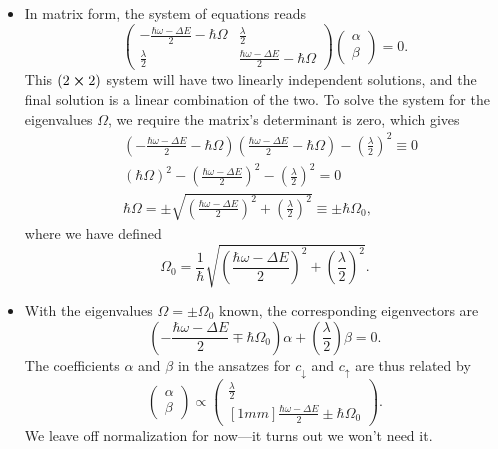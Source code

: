 \documentclass[11pt, a4paper]{article}
\newcommand{\ua}{\uparrow}  %
\newcommand{\da}{\downarrow}  %
\begin{document}
\begin{itemize}
	\item In matrix form, the system of equations reads
	\begin{equation*}
		\begin{pmatrix}
            -\frac{\hbar \omega - \Delta E}{2} - \hbar \Omega & \frac{\lambda}{2}\\[1mm]
			\frac{\lambda}{2} & \frac{\hbar \omega - \Delta E}{2} - \hbar \Omega
		\end{pmatrix}
		\begin{pmatrix}
		\alpha\\
		\beta
		\end{pmatrix}
		= 0.
	\end{equation*}
    This $ (2 \cross 2) $ system will have two linearly independent solutions, and the final solution is a linear combination of the two. To solve the system for the eigenvalues $ \Omega $, we require the matrix's determinant is zero, which gives
	\begin{align*}
		&\left(-\frac{\hbar \omega - \Delta E}{2} - \hbar \Omega\right)\left(\frac{\hbar \omega - \Delta E}{2} - \hbar \Omega\right) - \left(\frac{\lambda}{2}\right)^{2} \equiv 0\\
		&(\hbar \Omega)^{2} - \left(\frac{\hbar \omega - \Delta E}{2}\right)^{2} - \left(\frac{\lambda}{2}\right)^{2} = 0\\
		& \hbar \Omega = \pm \sqrt{\left(\frac{\hbar \omega - \Delta E}{2}\right)^{2} + \left(\frac{\lambda}{2}\right)^{2}} \equiv \pm \hbar \Omega_{0},
	\end{align*}
    where we have defined
    \begin{equation*}
        \Omega_{0} = \frac{1}{\hbar} \sqrt{\left(\frac{\hbar \omega - \Delta E}{2}\right)^{2} + \left(\frac{\lambda}{2}\right)^{2}}.
    \end{equation*}
    
    \item With the eigenvalues $ \Omega = \pm \Omega_{0} $ known, the corresponding eigenvectors are
	\begin{equation*}
		\left(- \frac{\hbar \omega - \Delta E}{2} \mp \hbar \Omega_{0}\right)\alpha + \left(\frac{\lambda}{2}\right)\beta = 0.
	\end{equation*}
    The coefficients $ \alpha $ and $ \beta $ in the ansatzes for $ c_{\da} $ and $ c_{\ua} $ are thus related by
	\begin{equation*}
		\begin{pmatrix}
			\alpha\\
			\beta
		\end{pmatrix}
		\propto
		\begin{pmatrix}
            \frac{\lambda}{2}\\ [1mm]
			\frac{\hbar \omega - \Delta E}{2} \pm \hbar \Omega_{0}
		\end{pmatrix}.
	\end{equation*}
	We leave off normalization for now---it turns out we won't need it.
	

\end{itemize}
\end{document}
